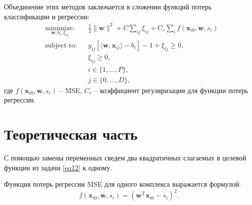 \documentclass[12pt,twoside]{article}
\begin{document}
Объединение этих методов заключается в сложении функций потерь классификации и регрессии:
\begin{equation}\label{eq12}
\begin{aligned}
& \underset{\mathbf{w}, b_i, \xi_{ij}}{\text{minimize:}}
& & \frac{1}{2} \|\mathbf{w}\|^2 + C\sum\limits_{ij}\xi_{ij} + C_{r}\sum\limits_{i} f(\mathbf{x}_{i0},\mathbf{w}, s_i) \\
& \text{subject to:}
& & y_{ij}[\langle\mathbf{w},\mathbf{x}_{ij}\rangle - b_i]-1+\xi_{ij} \geq 0, \\
&&& \xi_{ij} \geq 0, \\
&&&i\in\{1,\dots,P\}, \\
&&&j\in\{0,\dots,D\},
\end{aligned}
\end{equation}
где $f(\mathbf{x}_{i0},\mathbf{w}, s_i)$ -- MSE, $C_r$ -- коэффициент регуляризации для функции потерь регрессии. 

\section{Теоретическая часть}
С помощью замены переменных сведем два квадратичных слагаемых в целевой функции из задачи \eqref{eq12} к одному. 

Функция потерь регрессии MSE для одного комплекса выражается формулой:
\begin{equation}\label{eq15}
f({\mathbf{x}}_{i0}, {\mathbf{w}}, s_i) = ({\mathbf{w}}^{\text{T}}{\mathbf{x}}_{i0} - s_i)^2.
\end{equation}
\end{document}
